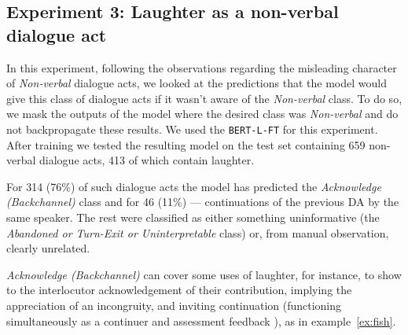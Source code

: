 \documentclass[11pt,a4paper]{article}
\begin{document}

\subsection{Experiment 3: Laughter as a non-verbal dialogue act}
\label{sec:laughter-as-non}

In this experiment, following the observations regarding the
misleading character of \emph{Non-verbal} dialogue acts, we looked at
the predictions that the model would give this class of dialogue acts
if it wasn't aware of the \emph{Non-verbal} class. To do so, we mask
the outputs of the model where the desired class was \emph{Non-verbal}
and do not backpropagate these results. We used the \texttt{BERT-L-FT}
for this experiment. After training we tested the resulting model on
the test set containing 659 non-verbal dialogue acts, 413 of which
contain laughter.

For 314 (76\%) of such dialogue acts the model has predicted the
\emph{Acknowledge (Backchannel)} class and for 46 (11\%) ---
continuations of the previous DA by the same speaker. The rest were
classified as either something uninformative (the \emph{Abandoned or
  Turn-Exit or Uninterpretable} class) or, from manual observation,
clearly unrelated.

\emph{Acknowledge (Backchannel)} can cover some uses of laughter, for
instance, to show to the interlocutor acknowledgement of their
contribution, implying the appreciation of an incongruity, and
inviting continuation (functioning simultaneously as a continuer and
assessment feedback
\citep{schegloff1982discourse}), as in example~\ref{ex:fish}.
\end{document}

